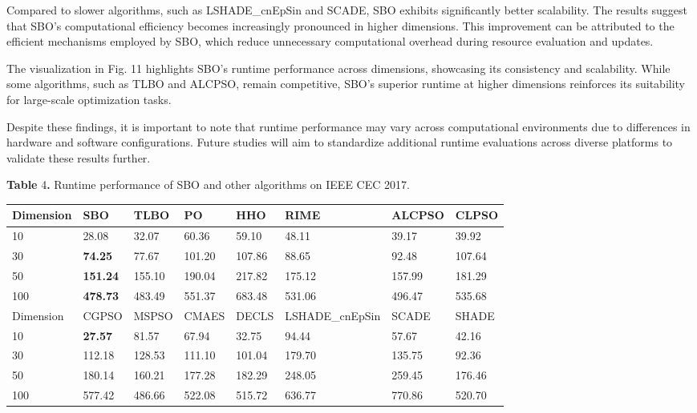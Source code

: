 \documentclass{article} %
\begin{document}
Compared to slower algorithms, such as LSHADE\_cnEpSin and SCADE, SBO exhibits significantly better scalability. The results suggest that SBO's computational efficiency becomes increasingly pronounced in higher dimensions. This improvement can be attributed to the efficient mechanisms employed by SBO, which reduce unnecessary computational overhead during resource evaluation and updates.

The visualization in Fig. 11 highlights SBO's runtime performance across dimensions, showcasing its consistency and scalability. While some algorithms, such as TLBO and ALCPSO, remain competitive, SBO's superior runtime at higher dimensions reinforces its suitability for large-scale optimization tasks.

Despite these findings, it is important to note that runtime performance may vary across computational environments due to differences in hardware and software configurations. Future studies will aim to standardize additional runtime evaluations across diverse platforms to validate these results further.

\noindent 

\noindent \textbf{Table }4\textbf{. }Runtime performance of SBO and other algorithms on IEEE CEC 2017.

\begin{tabular}{|p{0.5in}|p{0.4in}|p{0.4in}|p{0.4in}|p{0.4in}|p{0.8in}|p{0.4in}|p{0.4in}|} \hline 
Dimension & SBO & TLBO & PO & HHO & RIME & ALCPSO & CLPSO \\ \hline 
10 & 28.08  & 32.07  & 60.36  & 59.10  & 48.11  & 39.17  & 39.92  \\ \hline 
30 & \textbf{74.25 } & 77.67  & 101.20  & 107.86  & 88.65  & 92.48  & 107.64  \\ \hline 
50 & \textbf{151.24 } & 155.10  & 190.04  & 217.82  & 175.12  & 157.99  & 181.29  \\ \hline 
100 & \textbf{478.73 } & 483.49  & 551.37  & 683.48  & 531.06  & 496.47  & 535.68  \\ \hline 
Dimension & CGPSO & MSPSO & CMAES & DECLS & LSHADE\_cnEpSin & SCADE & SHADE \\ \hline 
10 & \textbf{27.57 } & 81.57  & 67.94  & 32.75  & 94.44  & 57.67  & 42.16  \\ \hline 
30 & 112.18  & 128.53  & 111.10  & 101.04  & 179.70  & 135.75  & 92.36  \\ \hline 
50 & 180.14  & 160.21  & 177.28  & 182.29  & 248.05  & 259.45  & 176.46  \\ \hline 
100 & 577.42  & 486.66  & 522.08  & 515.72  & 636.77  & 770.86  & 520.70  \\ \hline 
\end{tabular}
\end{document}
